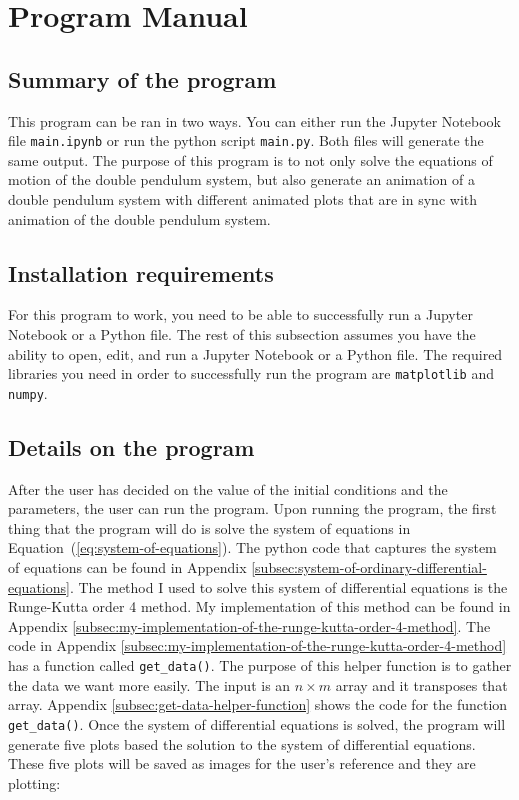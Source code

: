 \section{Program Manual}
\subsection{Summary of the program}
This program can be ran in two ways. You can either run the Jupyter Notebook file \texttt{main.ipynb} or run the python script \texttt{main.py}. Both files will generate the same output. The purpose of this program is to not only solve the equations of motion of the double pendulum system, but also generate an animation of a double pendulum system with different animated plots that are in sync with animation of the double pendulum system.

\subsection{Installation requirements}
For this program to work, you need to be able to successfully run a Jupyter Notebook or a Python file. The rest of this subsection assumes you have the ability to open, edit, and run a Jupyter Notebook or a Python file. The required libraries you need in order to successfully run the program are \texttt{matplotlib} and \texttt{numpy}. 

\subsection{Details on the program}
After the user has decided on the value of the initial conditions and the parameters, the user can run the program. Upon running the program, the first thing that the program will do is solve the system of equations in Equation~(\ref{eq:system-of-equations}). The python code that captures the system of equations can be found in Appendix \ref{subsec:system-of-ordinary-differential-equations}. The method I used to solve this system of differential equations is the Runge-Kutta order 4 method. My implementation of this method can be found in Appendix \ref{subsec:my-implementation-of-the-runge-kutta-order-4-method}. The code in Appendix \ref{subsec:my-implementation-of-the-runge-kutta-order-4-method} has a function called \verb|get_data()|. The purpose of this helper function is to gather the data we want more easily. The input is an $n \times m$ array and it transposes that array. Appendix \ref{subsec:get-data-helper-function} shows the code for the function \verb|get_data()|. Once the system of differential equations is solved, the program will generate five plots based the solution to the system of differential equations. These five plots will be saved as images for the user's reference and they are plotting:

